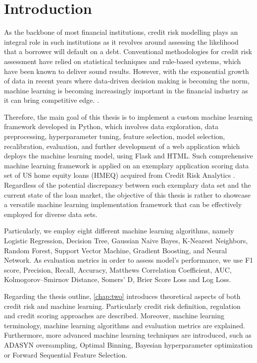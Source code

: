 \chapter{Introduction}
\label{chap:one}

As the backbone of most financial institutions, credit risk modelling plays an integral role  in such institutions as it  revolves around assessing the likelihood that a borrower will default on a debt.
Conventional methodologies for credit risk assessment have relied on statistical techniques and rule-based systems, which have been known to deliver sound results.
However, with the exponential growth of data in recent years where data-driven decision making is becoming the norm, machine learning is becoming increasingly important in the financial industry as it can bring competitive edge. \citep{PwC2023}.


Therefore, the main goal of this thesis is to implement a custom machine learning framework developed in Python, which involves data exploration, data preprocessing, hyperparameter tuning, feature selection, model selection, recalibration, evaluation, and further development of a web application which deploys the machine learning model, using Flask and HTML.
Such comprehensive machine learning framework is applied on an exemplary application scoring data set of US home equity loans (HMEQ) acquired from Credit Risk Analytics \citep{baesens2016credit}.
Regardless of the potential discrepancy between such exemplary data set and the current state of the loan market, the objective of this thesis is rather to showcase a versatile machine learning implementation framework that can be effectively employed for diverse data sets.


Particularly, we employ eight different machine learning algorithms, namely Logistic Regression, Decision Tree, Gaussian Naive Bayes, K-Nearest Neighbors, Random Forest, Support Vector Machine, Gradient Boosting, and Neural Network.
As evaluation metrics in order to assess model's performance, we use F1 score, Precision, Recall, Accuracy, Matthews Correlation Coefficient, AUC, Kolmogorov--Smirnov Distance, Somers' D, Brier Score Loss and Log Loss.


Regarding the thesis outline, \autoref{chap:two} introduces theoretical aspects of both credit risk  and machine learning. Particularly credit risk definition, regulation and credit scoring approaches are described. Moreover, machine learning terminology, machine learning algorithms and evaluation metrics are explained.
Furthermore, more advanced machine learning techniques are introduced, such as ADASYN oversampling, Optimal Binning, Bayesian hyperparameter optimization or Forward Sequential Feature Selection.

